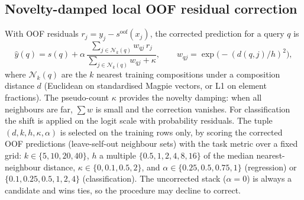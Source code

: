 \subsection{Novelty-damped local OOF residual correction}
\label{sec:naive}
With OOF residuals $r_j = y_j - s^{\mathrm{oof}}(x_j)$, the corrected prediction for a query $q$ is
\begin{equation}
\hat y(q) = s(q) + \alpha\,\frac{\sum_{j\in\mathcal N_k(q)} w_{qj}\,r_j}{\sum_{j\in\mathcal N_k(q)} w_{qj} + \kappa},
\qquad w_{qj}=\exp\!\big(-(d(q,j)/h)^2\big),
\label{eq:naive}
\end{equation}
where $\mathcal N_k(q)$ are the $k$ nearest training compositions under a composition distance $d$ (Euclidean on standardised Magpie vectors, or L1 on element fractions).
The pseudo-count $\kappa$ provides the novelty damping: when all neighbours are far, $\sum w$ is small and the correction vanishes.
For classification the shift is applied on the logit scale with probability residuals.
The tuple $(d,k,h,\kappa,\alpha)$ is selected on the training rows only, by scoring the corrected OOF predictions (leave-self-out neighbour sets) with the task metric over a fixed grid: $k\in\{5,10,20,40\}$, $h$ a multiple $\{0.5,1,2,4,8,16\}$ of the median nearest-neighbour distance, $\kappa\in\{0,0.1,0.5,2\}$, and $\alpha\in\{0.25,0.5,0.75,1\}$ (regression) or $\{0.1,0.25,0.5,1,2,4\}$ (classification).
The uncorrected stack ($\alpha=0$) is always a candidate and wins ties, so the procedure may decline to correct.

